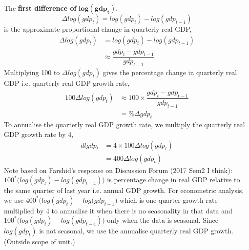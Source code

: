 \documentclass[12pt]{report}
\begin{document}
\noindent The \textbf{first difference of} $\boldsymbol{log(gdp_t)}$, $$\Delta log(gdp_t) = log(gdp_t)-log(gdp_{t-1})$$ is the approximate proportional change in quarterly real GDP,
\begin{align*}
	\Delta log(gdp_t) &= log(gdp_t)-log(gdp_{t-1}) \\
	&\approx \dfrac{gdp_t - gdp_{t-1}}{gdp_{t-1}}
\end{align*} Multiplying 100 to $\Delta log(gdp_t)$ gives the percentage change in quarterly real GDP i.e. quarterly real GDP growth rate, \begin{align*}
100\Delta log(gdp_t) &\approx 100\times \dfrac{gdp_t - gdp_{t-1}}{gdp_{t-1}} \\
&=\%\Delta gdp_t
\end{align*} 
\noindent To annualise the quarterly real GDP growth rate, we multiply the quarterly real GDP growth rate by 4, \begin{align*}
	dlgdp_t&=4\times 100\Delta log(gdp_t) \\
	&=400\Delta log(gdp_t)
\end{align*} Note based on Farshid's response on Discussion Forum (2017 Sem2 I think): \\ $100^*\big(log(gdp_t) - log(gdp_{t-4})\big)$ is percentage change in real GDP relative to the same quarter of last year i.e. annual GDP growth. For econometric analysis, we use $400^*\big(log(gdp_t) - log(gdp_{t-1}\big)$ which is one quarter growth rate multiplied by 4 to annualise it when there is no seasonality in that data and $100^*\big(log(gdp_t) - log(gdp_{t-4})\big)$ only when the data is seasonal. Since $log(gdp_t)$ is not seasonal, we use the annualise quarterly real GDP growth. (Outside scope of unit.)
\end{document}
